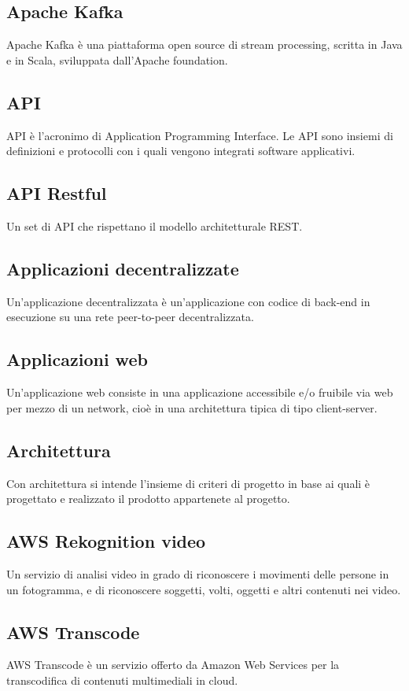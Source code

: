 \subsection*{Apache Kafka}
Apache Kafka è una piattaforma open source di stream processing, scritta in Java e in Scala, sviluppata dall'Apache foundation.

\subsection*{API}
API è l'acronimo di Application Programming Interface. Le API sono insiemi di definizioni e protocolli con i quali vengono integrati software applicativi.

\subsection*{API Restful}
Un set di API che rispettano il modello architetturale REST.

\subsection*{Applicazioni decentralizzate}
Un'applicazione decentralizzata è un'applicazione con codice di back-end in esecuzione su una rete peer-to-peer decentralizzata.

\subsection*{Applicazioni web}
Un'applicazione web consiste in una applicazione accessibile e/o fruibile via web per mezzo di un network, cioè in una architettura tipica di tipo client-server.

\subsection*{Architettura}
Con architettura si intende l'insieme di criteri di progetto in base ai quali è progettato e realizzato il prodotto appartenete al progetto.

\subsection*{AWS Rekognition video}
Un servizio di analisi video in grado di riconoscere i movimenti delle persone in un fotogramma, e di riconoscere soggetti, volti, oggetti e altri contenuti nei video.

\subsection*{AWS Transcode}
AWS Transcode è un servizio offerto da Amazon Web Services per la transcodifica di contenuti multimediali in cloud.


